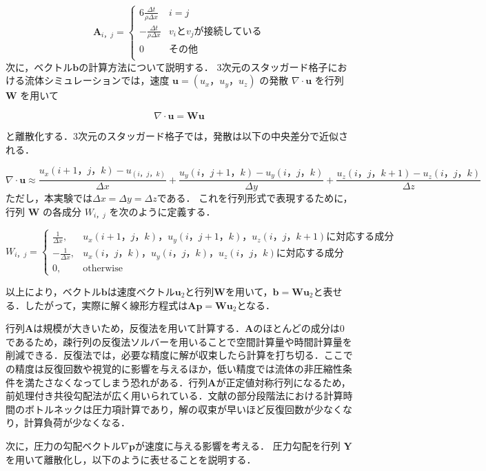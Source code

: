 \documentclass[a4j,12pt]{jreport}
\begin{document}
\[
	\bm{A}_{i，j} = 
	\begin{cases}
 	6\frac{\varDelta t}{\rho \varDelta x} 	& i = j\\
 	-\frac{\varDelta t}{\rho \varDelta x}   	& v_iとv_jが接続している\\
 	0  							& その他\\
	\end{cases}
\]
次に，ベクトル$\bm{b}$の計算方法について説明する．
3次元のスタッガード格子における流体シミュレーションでは，速度 $\bm{u} = (u_x，u_y，u_z)
$ の発散 $\nabla \cdot \bm{u}$ を行列 $\bm{W}$ を用いて

\[
\nabla \cdot \bm{u} = \bm{W} \bm{u}
\]

と離散化する．3次元のスタッガード格子では，発散は以下の中央差分で近似される．

\[
\nabla \cdot \bm{u} \approx \frac{u_x(i+1，j，k) - u_(i，j，k)}{\varDelta x} + \frac{u_y(i，j+1，k)- u_y(i，j，k)}{\varDelta y} + \frac{u_z(i，j，k+1) - u_z(i，j，k)}{\varDelta z}
\]
ただし，本実験では$\varDelta x = \varDelta y= \varDelta z$である．
これを行列形式で表現するために，行列 $\bm{W}$ の各成分 $W_{i，j}$ を次のように定義する．

\begin{equation}
W_{i，j} =
\begin{cases}
\frac{1}{\varDelta x}, &  u_x(i+1，j，k)，u_y(i，j+1，k)，u_z(i，j，k+1)に対応する成分 \\
-\frac{1}{\varDelta x}, & u_x(i，j，k)，u_y(i，j，k)，u_z(i，j，k)に対応する成分\\
0, & \text{otherwise}
\end{cases}
\end{equation}

以上により，ベクトル$\bm{b}$は速度ベクトル$\bm{u}_2$と行列$\bm{W}$を用いて，$\bm{b} = \bm{W}\bm{u}_2$と表せる．したがって，実際に解く線形方程式は$\bm{A}\bm{p} = \bm{W}\bm{u}_2$となる．

行列$\bm{A}$は規模が大きいため，反復法を用いて計算する．$\bm{A}$のほとんどの成分は$0$であるため，疎行列の反復法ソルバーを用いることで空間計算量や時間計算量を削減できる．反復法では，必要な精度に解が収束したら計算を打ち切る．ここでの精度は反復回数や視覚的に影響を与えるほか，低い精度では流体の非圧縮性条件を満たさなくなってしまう恐れがある．行列$\bm{A}$が正定値対称行列になるため，前処理付き共役勾配法が広く用いられている．文献\cite{fedkiw}の部分段階法における計算時間のボトルネックは圧力項計算であり，解の収束が早いほど反復回数が少なくなり，計算負荷が少なくなる．

次に，圧力の勾配ベクトル$\nabla\bm{p}$が速度に与える影響を考える．
圧力勾配を行列 $\bm{Y}$ を用いて離散化し，以下のように表せることを説明する．
\end{document}

